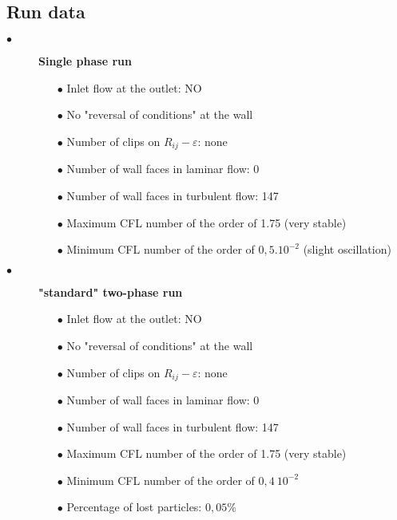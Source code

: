 \documentclass[a4paper,twoside,12pt]{article}
\begin{document}
\subsection{Run data}

\begin{description}

   \item[$\bullet$]\textbf{Single phase run}

         \begin{itemize}
            \item[$\bullet$] Inlet flow at the outlet: NO
            \item[$\bullet$] No "reversal of conditions" at the wall
            \item[$\bullet$] Number of clips on $R_{ij}-\varepsilon$: none
            \item[$\bullet$] Number of wall faces in laminar flow: 0
            \item[$\bullet$] Number of wall faces in turbulent flow: 147
            \item[$\bullet$] Maximum CFL number of the order of 1.75 (very stable)
            \item[$\bullet$] Minimum CFL number of the order of $0,5.10^{-2}$ (slight oscillation)
         \end{itemize}

   \item[$\bullet$]\textbf{"standard" two-phase run}

         \begin{itemize}
            \item[$\bullet$] Inlet flow at the outlet: NO
            \item[$\bullet$] No "reversal of conditions" at the wall
            \item[$\bullet$] Number of clips on $R_{ij}-\varepsilon$: none
            \item[$\bullet$] Number of wall faces in laminar flow: 0
            \item[$\bullet$] Number of wall faces in turbulent flow: 147
            \item[$\bullet$] Maximum CFL number of the order of 1.75 (very stable)
            \item[$\bullet$] Minimum CFL number of the order of $0,4~10^{-2}$
            \item[$\bullet$] Percentage of lost particles: $0,05$\%
         \end{itemize}


\end{description}
\end{document}
